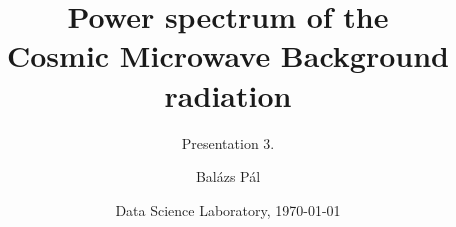 \title[Cosmic Microwave Background]
{Power spectrum of the\\Cosmic Microwave Background radiation}

\subtitle{Presentation 3.}

\author[Balázs Pál]
{Balázs Pál}


\date[ELTE 2020]
{Data Science Laboratory, \today}

